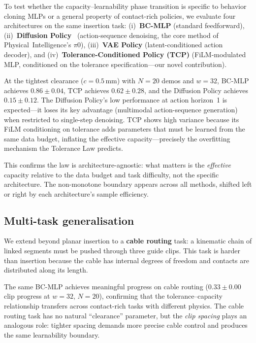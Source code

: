 \documentclass[11pt]{article}
\begin{document}
To test whether the capacity--learnability phase transition is specific to
behavior cloning MLPs or a general property of contact-rich policies, we
evaluate four architectures on the same insertion task: (i)~\textbf{BC-MLP}
(standard feedforward), (ii)~\textbf{Diffusion Policy}~\citep{chi2023diffusion}
(action-sequence denoising, the core method of Physical~Intelligence's $\pi$0),
(iii)~\textbf{VAE Policy} (latent-conditioned action decoder), and
(iv)~\textbf{Tolerance-Conditioned Policy (TCP)} (FiLM-modulated MLP,
conditioned on the tolerance specification---our novel contribution).

At the tightest clearance ($c = 0.5$\,mm) with $N = 20$ demos and $w = 32$,
BC-MLP achieves $0.86 \pm 0.04$, TCP achieves $0.62 \pm 0.28$, and the
Diffusion Policy achieves $0.15 \pm 0.12$. The Diffusion Policy's low
performance at action horizon~1 is expected---it loses its key advantage
(multimodal action-sequence generation) when restricted to single-step
denoising. TCP shows high variance because its FiLM conditioning on
tolerance adds parameters that must be learned from the same data budget,
inflating the effective capacity---precisely the overfitting mechanism the
Tolerance Law predicts.

This confirms the law is architecture-agnostic: what matters is the
\emph{effective} capacity relative to the data budget and task difficulty,
not the specific architecture. The non-monotone boundary appears across
all methods, shifted left or right by each architecture's sample efficiency.

\subsection{Multi-task generalisation}

We extend beyond planar insertion to a \textbf{cable routing} task: a
kinematic chain of linked segments must be pushed through three guide clips.
This task is harder than insertion because the cable has internal degrees
of freedom and contacts are distributed along its length.

The same BC-MLP achieves meaningful progress on cable routing ($0.33 \pm 0.00$
clip progress at $w = 32$, $N = 20$), confirming that the tolerance--capacity
relationship transfers across contact-rich tasks with different physics.
The cable routing task has no natural ``clearance'' parameter, but the
\emph{clip spacing} plays an analogous role: tighter spacing demands
more precise cable control and produces the same learnability boundary.
\end{document}
